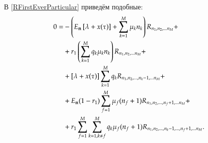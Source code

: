В \eqref{RFirstEverParticular} приведём подобные:
\begin{equation}\begin{aligned} \label{REquationParticular}
0=
    &-\Q{\En \T{\lxt}+\allExecutionFullIntensity{n}{k}}\seqStandart{R}{n}+\\
    &+r_1 \Q{\allExecutionRelativeIntensity{n}{k}} \seqStandart{R}{n} + \\
    &+\T{\lxt}\sum_{k=1}^{M}q_k \seqMinus{R}{n}{k} + \\
    &+\En (1 - r_1) \sum_{f=1}^{M} \mu_f (n_f + 1) \seqPlus{R}{n}{f} + \\
    &+r_1 \feedbackSum{f}{k}
        q_k \mu_f (n_f+1) \seqMinusPlus{R}{n}{k}{f}.
\end{aligned}\end{equation}



